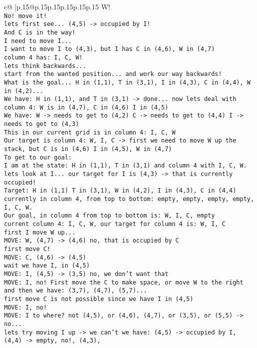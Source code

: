 \documentclass{article}
\begin{document}
{\begin{supertabular}{c@{$\;$}|p{.15\linewidth}@{}p{.15\linewidth}p{.15\linewidth}p{.15\linewidth}p{.15\linewidth}p{.15\linewidth}}
{{{W!\\ \tt  No! move it!\\ \tt  lets first see... (4,5) -> occupied by I!\\ \tt  And C is in the way!\\ \tt  I need to move I...\\ \tt  I want to move I to (4,3), but I has C in (4,6), W in (4,7)\\ \tt  column 4 has: I, C, W!\\ \tt  lets think backwards...\\ \tt  start from the wanted position... and work our way backwards!\\ \tt  What is the goal... H in (1,1), T in (3,1), I in (4,3), C in (4,4), W in (4,2)... \\ \tt  We have: H in (1,1), and T in (3,1) -> done... now lets deal with column 4: W is in (4,7), C in (4,6) I in (4,5)\\ \tt  We have: W -> needs to get to (4,2) C -> needs to get to (4,4) I -> needs to get to (4,3)\\ \tt  This in our current grid is in column 4: I, C, W\\ \tt  Our target is column 4: W, I, C -> first we need to move W up the stack, but C is in (4,6) I in (4,5), W in (4,7)\\ \tt  To get to our goal: \\ \tt  I am at the state: H in (1,1), T in (3,1) and column 4 with I, C, W.\\ \tt  lets look at I... our target for I is (4,3) -> that is currently occupied!\\ \tt  Target: H in (1,1) T in (3,1), W in (4,2), I in (4,3), C in (4,4) \\ \tt  currently in column 4, from top to bottom: empty, empty, empty, empty, I, C, W.\\ \tt  Our goal, in column 4 from top to bottom is: W, I, C, empty\\ \tt  current column 4: I, C, W, our target for column 4 is: W, I, C\\ \tt  first I move W up...\\ \tt  MOVE: W, (4,7) -> (4,6) no, that is occupied by C\\ \tt  first move C!\\ \tt  MOVE: C, (4,6) -> (4,5) \\ \tt  wait we have I, in (4,5)\\ \tt  MOVE: I, (4,5) -> (3,5) no, we don't want that\\ \tt  MOVE: I, no! First move the C to make space, or move W to the right and then we have: (3,7), (4,7), (5,7)...\\ \tt  first move C is not possible since we have I in (4,5) \\ \tt  MOVE: I, no! \\ \tt  MOVE: I to where? not (4,5), or (4,6), (4,7), or (3,5), or (5,5) -> no...\\ \tt  lets try moving I up -> we can't we have: (4,5) -> occupied by I, (4,4) -> empty, no!, (4,3), }}}
\end{supertabular}}
\end{document}
